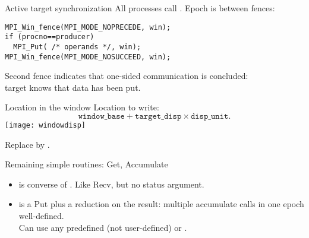\begin{numberedframe}{Active target synchronization}
  All processes call . Epoch is between fences:
\lstset{language=C}
\begin{lstlisting}
MPI_Win_fence(MPI_MODE_NOPRECEDE, win);
if (procno==producer)
  MPI_Put( /* operands */, win);
MPI_Win_fence(MPI_MODE_NOSUCCEED, win);
\end{lstlisting}
Second fence indicates that one-sided communication is concluded:\\
target knows that data has been put.
\end{numberedframe}


\begin{numberedframe}{Location in the window}
  Location to write:
  \[ \mathtt{window\_base} + \mathtt{target\_disp}\times \mathtt{disp\_unit}. \]
  \texttt{[image: windowdisp]}
\end{numberedframe}

\begin{exerciseframe}[rightput]
  
\end{exerciseframe}

\begin{exerciseframe}[randomput]
  
\end{exerciseframe}

\begin{optexerciseframe}[randomput]
  Replace  by .
\end{optexerciseframe}

\begin{numberedframe}{Remaining simple routines:
    Get, Accumulate}
  \begin{itemize}
  \item {} is converse of . Like Recv, but no
    status argument.
  \item {} is a Put plus a reduction on the result:
    multiple accumulate calls in one epoch well-defined.\\
    Can use any predefined  (not user-defined) or .
  \end{itemize}
\end{numberedframe}




